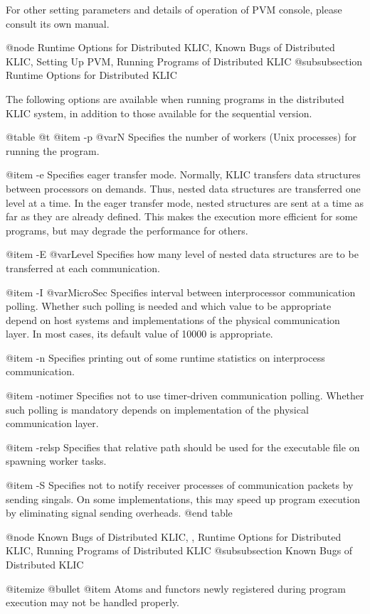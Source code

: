 {{{{For other setting parameters and details of operation of PVM console,
please consult its own manual.

@node Runtime Options for Distributed KLIC, Known Bugs of Distributed KLIC, Setting Up PVM, Running Programs of Distributed KLIC
@subsubsection Runtime Options for Distributed KLIC

The following options are available when running programs in the
distributed KLIC system, in addition to those available for the
sequential version.

@table @t
@item -p @var{N}
Specifies the number of workers (Unix processes) for running the
program.

@item -e
Specifies eager transfer mode.  Normally, KLIC transfers data structures
between processors on demands.  Thus, nested data structures are
transferred one level at a time.  In the eager transfer mode, nested
structures are sent at a time as far as they are already defined.  This
makes the execution more efficient for some programs, but may degrade
the performance for others.

@item -E @var{Level}
Specifies how many level of nested data structures are to be transferred
at each communication.

@item -I @var{MicroSec}
Specifies interval between interprocessor communication polling.
Whether such polling is needed and which value to be appropriate
depend on host systems and implementations of the physical communication
layer.  In most cases, its default value of 10000 is appropriate.

@item -n
Specifies printing out of some runtime statistics on interprocess
communication.

@item -notimer
Specifies not to use timer-driven communication polling.  Whether such
polling is mandatory depends on implementation of the physical
communication layer.

@item -relsp
Specifies that relative path should be used for the executable file on
spawning worker tasks.

@item -S
Specifies not to notify receiver processes of communication packets by
sending singals.  On some implementations, this may speed up program
execution by eliminating signal sending overheads.
@end table

@node Known Bugs of Distributed KLIC,  , Runtime Options for Distributed KLIC, Running Programs of Distributed KLIC
@subsubsection Known Bugs of Distributed KLIC

@itemize @bullet
@item
Atoms and functors newly registered during program execution may not be
handled properly.

}}}}
